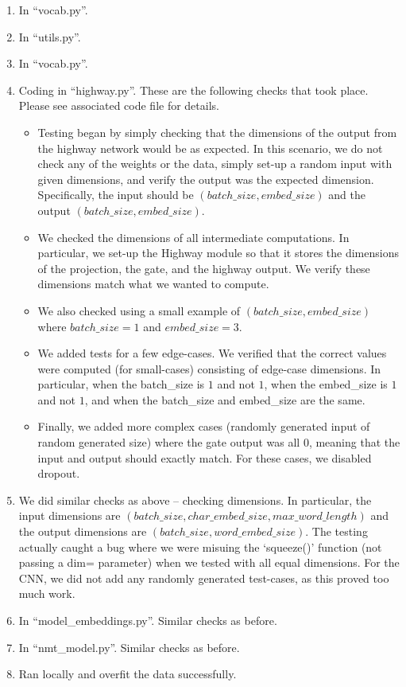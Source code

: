 \documentclass[12pt]{article}
\begin{document}
\begin{enumerate}[label=(\alph*)]
\begin{itemize}
    \end{itemize}
  \item In ``vocab.py''.
  \item In ``utils.py''.
  \item In ``vocab.py''.
  \item Coding in ``highway.py''.
    These are the following checks that took place. Please see associated code file for details.
    \begin{itemize}
      \item Testing began by simply checking that the dimensions of the output from the highway network would be as expected. In this scenario, we do not check any of the weights or the data, simply set-up a random input with given dimensions, and verify the output was the expected dimension. Specifically, the input should be $(batch\_size, embed\_size)$ and the output $(batch\_size, embed\_size)$.
      \item We checked the dimensions of all intermediate computations. In particular, we set-up the Highway module so that it stores the dimensions of the projection, the gate, and the highway output. We verify these dimensions match what we wanted to compute.
      \item We also checked using a small example of $(batch\_size, embed\_size)$ where $batch\_size = 1$ and $embed\_size = 3$.
      \item We added tests for a few edge-cases. We verified that the correct values were computed (for small-cases) consisting of edge-case dimensions. In particular, when the batch\_size is $1$ and not $1$, when the embed\_size is $1$ and not $1$, and when the batch\_size and embed\_size are the same.
      \item Finally, we added more complex cases (randomly generated input of random generated size) where the gate output was all $0$, meaning that the input and output should exactly match. For these cases, we disabled dropout.
    \end{itemize}
  \item We did similar checks as above -- checking dimensions. In particular, the input dimensions are $(batch\_size, char\_embed\_size, max\_word\_length)$ and the output dimensions are $(batch\_size, word\_embed\_size)$. The testing actually caught a bug where we were misuing the `squeeze()' function (not passing a dim= parameter) when we tested with all equal dimensions. For the CNN, we did not add any randomly generated test-cases, as this proved too much work. 
  \item In ``model\_embeddings.py''. Similar checks as before.
  \item In ``nmt\_model.py''. Similar checks as before.
  \item Ran locally and overfit the data successfully.
\end{enumerate}
\end{document}
